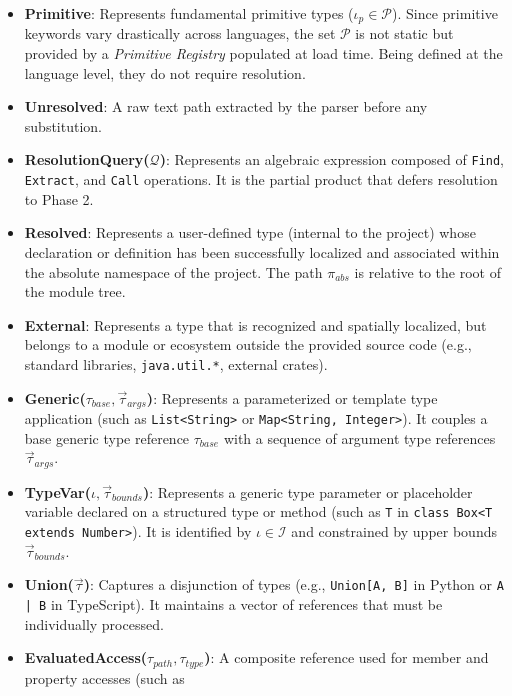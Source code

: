 \begin{itemize}
  \item \textbf{Primitive}: Represents fundamental primitive types
    ($\iota_p \in \mathcal{P}$). Since primitive keywords vary drastically
    across languages, the set $\mathcal{P}$ is not static but
    provided by a \textit{Primitive Registry} populated at load time.
    Being defined at the language level, they do not require resolution.
  \item \textbf{Unresolved}: A raw text path extracted by the parser
    before any substitution.
  \item \textbf{ResolutionQuery($\mathcal{Q}$)}: Represents an
    algebraic expression composed of \texttt{Find}, \texttt{Extract},
    and \texttt{Call} operations. It is the partial product that
    defers resolution to Phase 2.
  \item \textbf{Resolved}: Represents a user-defined type (internal
    to the project) whose declaration or definition has been
    successfully localized and associated within the absolute
    namespace of the project. The path $\pi_{abs}$ is relative to the
    root of the module tree.
  \item \textbf{External}: Represents a type that is recognized and
    spatially localized, but belongs to a module or ecosystem outside
    the provided source code (e.g., standard libraries,
    \texttt{java.util.*}, external crates).
  \item \textbf{Generic($\tau_{base}, \vec{\tau}_{args}$)}: Represents a
    parameterized or template type application (such as \texttt{List<String>} or
    \texttt{Map<String, Integer>}). It couples a base generic type
    reference $\tau_{base}$
    with a sequence of argument type references $\vec{\tau}_{args}$.
  \item \textbf{TypeVar($\iota, \vec{\tau}_{bounds}$)}: Represents a
    generic type parameter or placeholder variable declared on a
    structured type or
    method (such as \texttt{T} in \texttt{class Box<T extends Number>}).
    It is identified by $\iota \in \mathcal{I}$ and constrained by upper bounds
    $\vec{\tau}_{bounds}$.
  \item \textbf{Union($\vec{\tau}$)}: Captures a disjunction of types
    (e.g., \texttt{Union[A, B]} in Python or \texttt{A | B} in
    TypeScript). It maintains a vector of references that must be
    individually processed.
  \item \textbf{EvaluatedAccess($\tau_{path}, \tau_{type}$)}: A
    composite reference used for member and property accesses (such as

\end{itemize}
